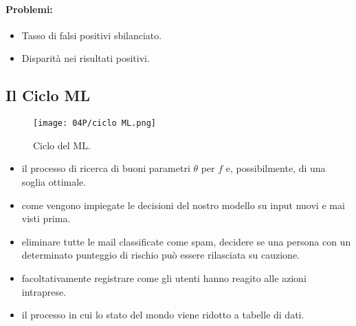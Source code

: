 

\paragraph{Problemi:}

\begin{itemize}
  \item Tasso di falsi positivi sbilanciato. 
  \item Disparità nei risultati positivi.
\end{itemize}

\subsection{Il Ciclo ML}


\begin{figure}[h]
    \centering
    \texttt{[image: 04P/ciclo ML.png]}
    \caption{Ciclo del ML.}
\end{figure}

\begin{itemize}
  \item {} il processo di ricerca di buoni parametri $\theta$ per $f$ e, possibilmente, di una soglia ottimale.
  \item {} come vengono impiegate le decisioni del nostro modello su input nuovi e mai visti prima. 
  \item {} eliminare tutte le mail classificate come spam, decidere se una persona con un determinato punteggio di rischio può essere rilasciata su cauzione.
  \item {} facoltativamente registrare come gli utenti hanno reagito alle azioni intraprese.
  \item {} il processo in cui lo stato del mondo viene ridotto a tabelle di dati.
\end{itemize}


